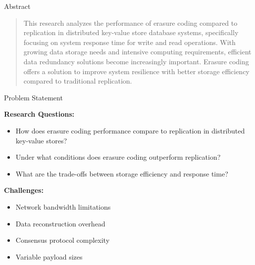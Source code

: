 \documentclass[a0,landscape]{config/poster/a0poster}
\newcommand{\postersection}[1]{%
  \begin{tcolorbox}[
      colback=ITBblue,
      colframe=ITBblue,
      fonttitle=\bfseries,
      coltext=white,
      sharp corners,
      boxrule=0pt,
      top=6pt,
      bottom=6pt,
      halign=center
    ]
    \Large #1
  \end{tcolorbox}%
}
\begin{document}
\begin{multicols}{4} %


	\postersection{Abstract}
	\begin{quote}
		This research analyzes the performance of erasure coding compared to replication in distributed key-value store database systems, specifically focusing on system response time for write and read operations. With growing data storage needs and intensive computing requirements, efficient data redundancy solutions become increasingly important. Erasure coding offers a solution to improve system resilience with better storage efficiency compared to traditional replication.
	\end{quote}


	\postersection{Problem Statement}
	
	\textbf{Research Questions:}
	\begin{itemize}
		\item How does erasure coding performance compare to replication in distributed key-value stores?
		\item Under what conditions does erasure coding outperform replication?
		\item What are the trade-offs between storage efficiency and response time?
	\end{itemize}

	\textbf{Challenges:}
	\begin{itemize}
		\item Network bandwidth limitations
		\item Data reconstruction overhead
		\item Consensus protocol complexity
		\item Variable payload sizes
	\end{itemize}



\end{multicols}
\end{document}
